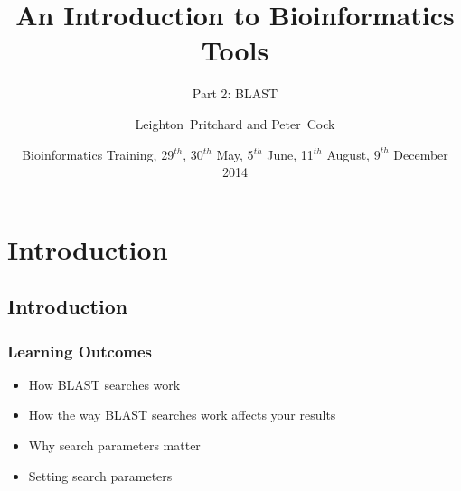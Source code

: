 
%



\title[Intro to Bioinformatics] %
{An Introduction to Bioinformatics Tools}
\subtitle{Part 2: BLAST}
\author[Pritchard, Cock] %
{Leighton~Pritchard and Peter~Cock}
\date[May, June, August, December 2014] %
{Bioinformatics Training, 29$^{th}$, 30$^{th}$ May, 5$^{th}$ June, 11$^{th}$ August, $9^{th}$ December 2014}
\subject{Bioinformatics}





\frame[plain]{\titlepage}

\section{Introduction}
\subsection{Introduction}
\begin{frame}
  \frametitle{Learning Outcomes}
  \begin{itemize}
    \item How BLAST searches work
    \item How the way BLAST searches work affects your results
    \item Why search parameters matter
    \item Setting search parameters
 \end{itemize}
\end{frame}    
  
%
%

